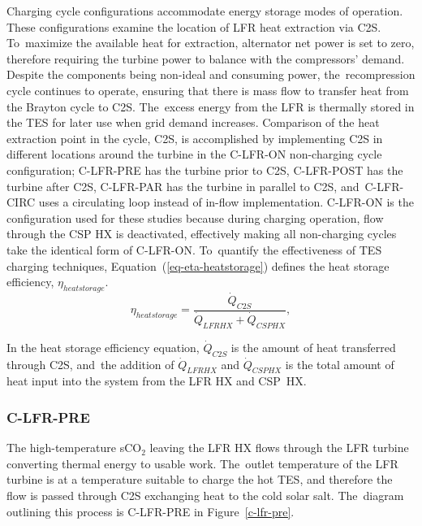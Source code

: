 \documentclass[sustainability,article,accept,moreauthors,pdftex]{Definitions/mdpi}
\begin{document}
\begin{paracol}{2}
Charging cycle configurations accommodate energy storage modes of operation. These configurations examine the location of LFR heat extraction via C2S. To~maximize the available heat for extraction, alternator net power is set to zero, therefore requiring the turbine power to balance with the compressors' demand. Despite the components being non-ideal and consuming power, the~recompression cycle continues to operate, ensuring that there is mass flow to transfer heat from the Brayton cycle to C2S. The~excess energy from the LFR is thermally stored in the TES for later use when grid demand increases. Comparison of the heat extraction point in the cycle, C2S, is accomplished by implementing C2S in different locations around the turbine in the C-LFR-ON non-charging cycle configuration; C-LFR-PRE has the turbine prior to C2S, C-LFR-POST has the turbine after C2S, C-LFR-PAR has the turbine in parallel to C2S, and~C-LFR-CIRC uses a circulating loop instead of in-flow implementation. C-LFR-ON is the configuration used for these studies because during charging operation, flow through the CSP HX is deactivated, effectively making all non-charging cycles take the identical form of C-LFR-ON. To~quantify the effectiveness of TES charging techniques, Equation~(\ref{eq-eta-heatstorage}) defines the heat storage efficiency, $\eta_{heatstorage}$.
\begin{equation}
    \label{eq-eta-heatstorage}
    \eta_{heatstorage} = \frac{\dot{Q}_{C2S}}{\dot{Q}_{LFRHX}+\dot{Q}_{CSPHX}},
\end{equation}

In the heat storage efficiency equation, $\dot{Q}_{C2S}$ is the amount of heat transferred through C2S, and~the addition of $\dot{Q}_{LFRHX}$ and $\dot{Q}_{CSPHX}$ is the total amount of heat input into the system from the LFR HX and CSP~HX. 

\subsubsection{C-LFR-PRE} 

The high-temperature sCO$_2$ leaving the LFR HX flows through the LFR turbine converting thermal energy to usable work. The~outlet temperature of the LFR turbine is at a temperature suitable to charge the hot TES, and therefore the flow is passed through C2S exchanging heat to the cold solar salt. The~diagram outlining this process is C-LFR-PRE in Figure~\ref{c-lfr-pre}. 


\end{paracol}
\end{document}
